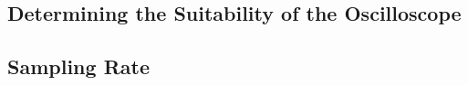    \subsection*{Determining the Suitability of the Oscilloscope}%

    \subsection*{Sampling Rate}%
